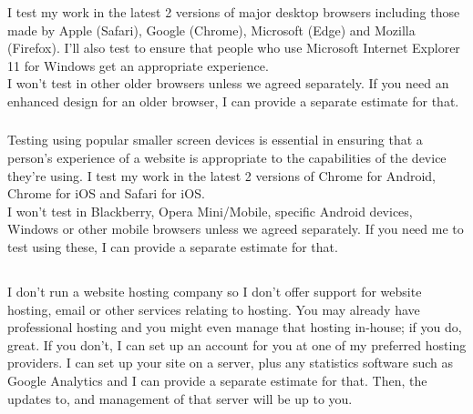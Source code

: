 \documentclass[10px,a4paper]{article}
\begin{document}
\subsubsection*{}

I test my work in the latest 2 versions of major desktop browsers including those made by Apple
(Safari), Google (Chrome), Microsoft (Edge) and Mozilla (Firefox). I'll also test to
ensure that people who use Microsoft Internet Explorer 11 for Windows get an appropriate experience.\\

I won't test in other older browsers unless we agreed separately. If you need an enhanced design
for an older browser, I can provide a separate estimate for that.

\subsubsection*{}

Testing using popular smaller screen devices is essential in ensuring that a person's
experience of a website is appropriate to the capabilities of the device they're using. I test my work in
the latest 2 versions of Chrome for Android, Chrome for iOS and Safari for iOS\@.\\

I won't test in Blackberry, Opera Mini/Mobile, specific Android devices, Windows or other mobile browsers unless we agreed separately.
If you need me to test using these, I can provide a separate estimate for that.

\subsection*{}

I don't run a website hosting company so I don't offer support for website hosting, email or other services relating to hosting.
You may already have professional hosting and you might even manage that hosting in-house; if you do, great.
If you don't, I can set up an account for you at one of my preferred hosting providers. I can set up your site on a server,
plus any statistics software such as Google Analytics and I can provide a separate estimate for that.
Then, the updates to, and management of that server will be up to you.

\subsection*{}
\end{document}
